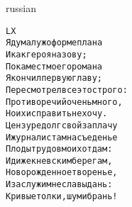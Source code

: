 \documentclass[12pt,twocolumn]{article}
\begin{document}
\begin{center}
\begin{otherlanguage*}{russian}
\begin{minipage}[t]{\dimexpr 0.5\textwidth -\tabcolsep-.5pt}
\begin{alltt}\normalfont\centering
LX
Я думал уж о форме плана
И как героя назову;
Покамест моего романа
Я кончил первую главу;
Пересмотрел все это строго:
Противоречий очень много,
Но их исправить не хочу.
Цензуре долг свой заплачу
И журналистам на съеденье
Плоды трудов моих отдам:
Иди же к невским берегам,
Новорожденное творенье,
И заслужи мне славы дань:
Кривые толки, шум и брань!
\end{alltt}
\end{minipage}

\end{otherlanguage*}
\end{center}
\end{document}
